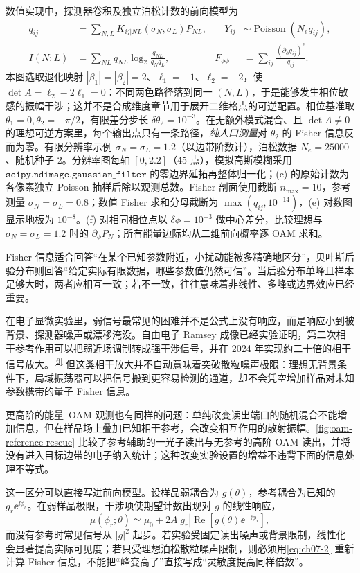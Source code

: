 数值实现中，探测器卷积及独立泊松计数的前向模型为
\[\begin{aligned}
q_{ij}&=\sum_{N,L}K_{ij|NL}(\sigma_N,\sigma_L)P_{NL},&\quad Y_{ij}&\sim\operatorname{Poisson}(N_eq_{ij}),\\
I(N{:}L)&=\sum_{NL}q_{NL}\log_2\frac{q_{NL}}{q_Nq_L},& F_{\phi\phi}&=\sum_{ij}\frac{(\partial_\phi q_{ij})^2}{q_{ij}}.
\end{aligned}\]
本图选取退化映射 $|\beta_1|=|\beta_2|=2$、$\ell_1=-1$、$\ell_2=-2$，使 $\det A=\ell_2-2\ell_1=0$：不同两色路径落到同一 $(N,L)$，于是能够发生相位敏感的振幅干涉；这并不是合成维度章节用于展开二维格点的可逆配置。相位基准取 $\theta_1=0,\theta_2=-\pi/2$，有限差分步长 $\delta\theta_2=10^{-3}$。在无额外模式混合、且 $\det A\ne0$ 的理想可逆方案里，每个输出点只有一条路径，\emph{纯人口测量}对 $\theta_2$ 的 Fisher 信息反而为零。有限分辨率示例 $\sigma_N=\sigma_L=1.2$（以边带阶数计），泊松数据 $N_e=25000$、随机种子 2。分辨率图每轴 $[0,2.2]$（45 点），模拟高斯模糊采用 $\texttt{scipy.ndimage.gaussian\_filter}$ 的零边界延拓再整体归一化；(c) 的原始计数为各像素独立 Poisson 抽样后除以观测总数。Fisher 剖面使用截断 $n_{\max}=10$，参考测量 $\sigma_N=\sigma_L=0.8$；数值 Fisher 求和分母截断为 $\max(q_{ij},10^{-14})$，(e) 对数图显示地板为 $10^{-8}$。(f) 对相同相位点以 $\delta\phi=10^{-3}$ 做中心差分，比较理想与 $\sigma_N=\sigma_L=1.2$ 时的 $\partial_\phi P_N$；所有能量边际均从二维前向概率逐 OAM 求和。


Fisher 信息适合回答“在某个已知参数附近，小扰动能被多精确地区分”，贝叶斯后验分布则回答“给定实际有限数据，哪些参数值仍然可信”。当后验分布单峰且样本足够大时，两者应相互一致；若不一致，往往意味着非线性、多峰或边界效应已经重要。


在电子显微实验里，弱信号最常见的困难并不是公式上没有响应，而是响应小到被背景、探测器噪声或漂移淹没。自由电子 Ramsey 成像已经实验证明，第二次相干参考作用可以把弱近场调制转成强干涉信号，并在 2024 年实现约二十倍的相干信号放大。\textsuperscript{\hyperref[ch07-ref6]{[6]}} 但这类相干放大并不自动意味着突破散粒噪声极限：理想无背景条件下，局域振荡器可以把信号搬到更容易检测的通道，却不会凭空增加样品对未知参数携带的量子 Fisher 信息。

更高阶的能量--OAM 观测也有同样的问题：单纯改变读出端口的随机混合不能增加信息，但在样品场上叠加已知相干参考，会改变相互作用的散射振幅。\cref{fig:oam-reference-rescue} 比较了参考辅助的一光子读出与无参考的高阶 OAM 读出，并将没有进入目标边带的电子纳入统计；这种改变实验设置的增益不违背下面的信息处理不等式。

这一区分可以直接写进前向模型。设样品弱耦合为 $g(\theta)$，参考耦合为已知的 $g_r \ee^{\ii\phi_r}$。在弱样品极限，干涉项使期望计数出现对 $g$ 的线性响应，
\begin{equation}
\mu(\phi_r;\theta)\simeq \mu_0+2A|g_r|\operatorname{Re}\!\left[g(\theta)\ee^{-\ii\phi_r}\right],
\label{eq:ch07-homodyne-forward}
\end{equation}
而没有参考时常见信号从 $|g|^2$ 起步。若实验受固定读出噪声或背景限制，线性化会显著提高实际可见度；若只受理想泊松散粒噪声限制，则必须用\cref{eq:ch07-2} 重新计算 Fisher 信息，不能把“峰变高了”直接写成“灵敏度提高同样倍数”。

